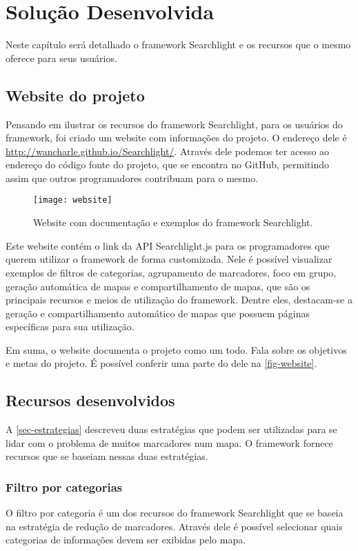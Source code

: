 \chapter{Solução Desenvolvida}

Neste capítulo será detalhado o framework Searchlight e os recursos que o mesmo oferece para seus usuários.

\section{Website do projeto}
Pensando em ilustrar os recursos do framework Searchlight, para os usuários do framework, foi criado um website com informações do projeto. O endereço dele é \url{http://wancharle.github.io/Searchlight/}. Através dele podemos ter acesso ao endereço do código fonte do projeto, que se encontra no GitHub, permitindo assim que outros programadores contribuam para o mesmo.

\begin{figure}[htb]
	\caption{\label{fig-website}Website com documentação e exemplos do framework Searchlight.}
	\begin{center}
	    \texttt{[image: website]}
	\end{center}
\end{figure}


Este website contém o link da API Searchlight.js para os programadores que querem utilizar o framework de forma customizada. Nele é possível visualizar exemplos de filtros de categorias, agrupamento de marcadores, foco em grupo, geração automática de mapas e compartilhamento de mapas, que são os principais recursos e meios de utilização do framework. Dentre eles, destacam-se a geração e compartilhamento automático de mapas que possuem páginas específicas para sua utilização. 


Em suma, o website documenta o projeto como um todo. Fala sobre os objetivos e metas do projeto. É possível conferir uma parte do dele na \autoref{fig-website}. 

\section{Recursos desenvolvidos}
A \autoref{sec-estrategias} descreveu duas estratégias que podem ser utilizadas para se lidar com o problema de muitos marcadores num mapa. O framework fornece recursos que se baseiam nessas duas estratégias. 

\subsection{Filtro por categorias}
O filtro por categoria é um dos recursos do framework Searchlight que se baseia na estratégia de redução de marcadores. Através dele é possível selecionar quais categorias de informações devem ser exibidas pelo mapa. 

